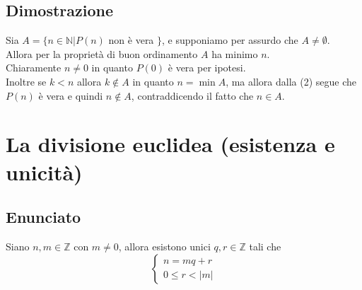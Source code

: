 \documentclass[a4paper,12pt]{article}
\begin{document}
\subsection*{Dimostrazione}
Sia $A = \{n \in \mathbb{N} | P(n)$ non è vera $\}$, e supponiamo per assurdo che $A \neq \emptyset$.\\
Allora per la proprietà di buon ordinamento $A$ ha minimo $n$.\\
Chiaramente $n \neq 0$ in quanto $P(0)$ è vera per ipotesi.\\
Inoltre se $k < n$ allora $k \notin A$ in quanto $n = \min A$, ma allora dalla (2) segue che $P(n)$ è vera e quindi $n \notin A$, contraddicendo il fatto che $n \in A$.

\clearpage

\section{La divisione euclidea (esistenza e unicità)}
\subsection*{Enunciato}
Siano $n, m \in \mathbb{Z}$ con $m \neq 0$, allora esistono unici $q, r \in \mathbb{Z}$ tali che
\[ \begin{cases}
		n = mq + r \\
		0 \leq r < |m|
	\end{cases} \]
	
\end{document}
